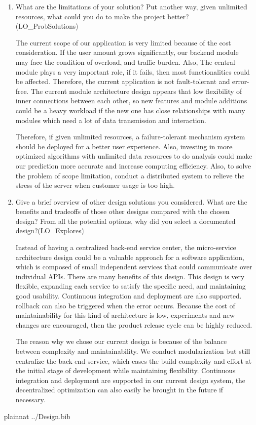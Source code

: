 \documentclass[12pt, titlepage]{article}
\begin{document}
\begin{enumerate}
  \item What are the limitations of your solution?  Put another way, given
  unlimited resources, what could you do to make the project better? (LO\_ProbSolutions)

  The current scope of our application is very limited because of the cost consideration. If the user amount grows significantly, our backend module may face the condition of overload, and traffic burden. Also, The central module plays a very important role, if it fails, then most functionalities could be affected. Therefore, the current application is not fault-tolerant and error-free. The current module architecture design appears that low flexibility of inner connections between each other, so new features and module additions could be a heavy workload if the new one has close relationships with many modules which need a lot of data transmission and interaction.

  Therefore, if given unlimited resources, a failure-tolerant mechanism system should be deployed for a better user experience. Also, investing in more optimized algorithms with unlimited data resources to do analysis could make our prediction more accurate and increase computing efficiency. Also, to solve the problem of scope limitation, conduct a distributed system to relieve the stress of the server when customer usage is too high.  
  \item Give a brief overview of other design solutions you considered.  What
  are the benefits and tradeoffs of those other designs compared with the chosen
  design?  From all the potential options, why did you select a documented design?(LO\_Explores)

  Instead of having a centralized back-end service center, the micro-service architecture design could be a valuable approach for a software application, which is composed of small independent services that could communicate over individual APIs. There are many benefits of this design. This design is very flexible, expanding each service to satisfy the specific need, and maintaining good usability. Continuous integration and deployment are also supported. rollback can also be triggered when the error occurs. Because the cost of maintainability for this kind of architecture is low, experiments and new changes are encouraged, then the product release cycle can be highly reduced. 
  
  The reason why we chose our current design is because of the balance between complexity and maintainability.  We conduct modularization but still centralize the back-end service, which eases the build complexity and effort at the initial stage of development while maintaining flexibility. Continuous integration and deployment are supported in our current design system, the decentralized optimization can also easily be brought in the future if necessary.

  
\end{enumerate}


 {plainnat}
 {../Design.bib}

\newpage{}
\end{document}
